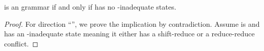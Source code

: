 \begin{isabellebody}
\begin{isamarkuptext}
\begin{theorem}\label{is_LR0_iff_no_LR0_inadequates}
 is an  grammar if and only if  has no -inadequate states.
\begin{proof}
For direction ``\isa{{\isasymLongrightarrow}}'', we prove the implication by contradiction.
Assume  is  and  has an -inadequate state  meaning it either has a 
shift-reduce or a reduce-reduce conflict. 


\end{proof}
\end{theorem}
\end{isamarkuptext}
\end{isabellebody}
